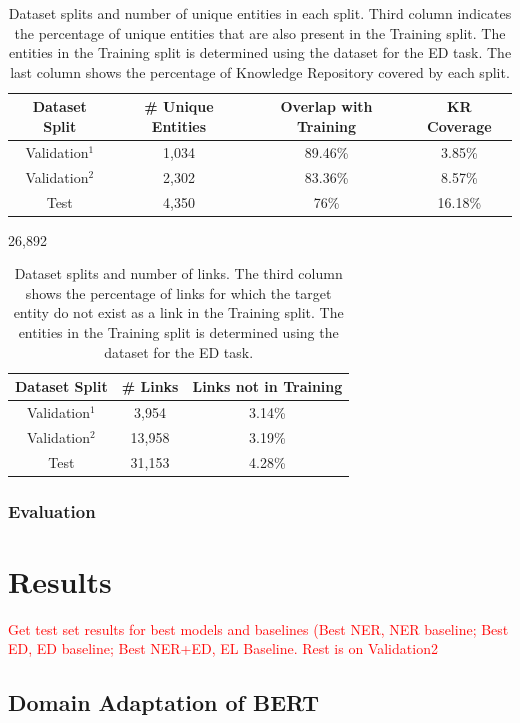 \documentclass{report}
\theoremstyle{definition}
\theoremstyle{remark}
\begin{document}
\begin{table}[h!]
    \centering
    \begin{tabular}{cccc}
    Dataset Split & \# Unique Entities & Overlap with Training & KR Coverage\\
    \hline
    Validation$^1$ & 1,034 & 89.46\% & 3.85\%\\
    Validation$^2$ & 2,302 & 83.36\% & 8.57\%\\
    Test & 4,350 & 76\%& 16.18\%\\
    \end{tabular}
    \caption{Dataset splits and number of unique entities in each split. Third column indicates the percentage of unique entities that are also present in the Training split. The entities in the Training split is determined using the dataset for the ED task. The last column shows the percentage of Knowledge Repository covered by each split.}
    \label{tab:goldstatsel2}
\end{table}
26,892
\begin{table}[h!]
    \centering
    \begin{tabular}{ccc}
    Dataset Split & \# Links & Links not in Training\\
    \hline
    Validation$^1$ & 3,954   & 3.14\% \\
    Validation$^2$ &  13,958 & 3.19\% \\
    Test &            31,153 & 4.28\% \\
    \end{tabular}
    \caption{Dataset splits and number of links. The third column shows the percentage of links for which the target entity do not exist as a link in the Training split. The entities in the Training split is determined using the dataset for the ED task.}
    \label{tab:goldstatsel3}
\end{table}

\subsection{Evaluation}




\newpage
\chapter{Results}
\textcolor{red}{Get test set results for best models and baselines (Best NER, NER baseline; Best ED, ED baseline; Best NER+ED, EL Baseline. Rest is on Validation2 }

\section{Domain Adaptation of BERT}
\end{document}
